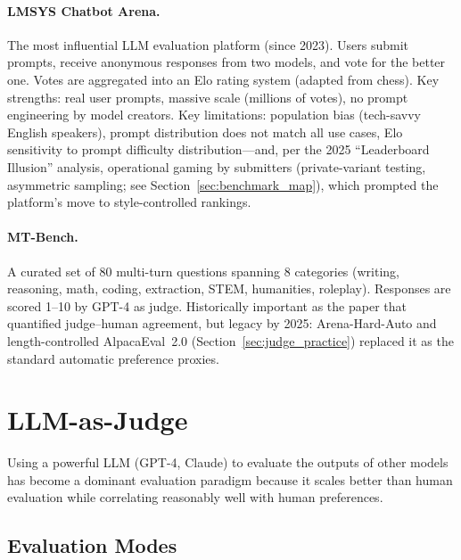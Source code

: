 \paragraph{LMSYS Chatbot Arena.}
The most influential LLM evaluation platform (since 2023).  Users submit
prompts, receive anonymous responses from two models, and vote for the better
one.  Votes are aggregated into an Elo rating system (adapted from chess).  Key
strengths: real user prompts, massive scale (millions of votes), no prompt
engineering by model creators.  Key limitations: population bias (tech-savvy
English speakers), prompt distribution does not match all use cases, Elo
sensitivity to prompt difficulty distribution---and, per the 2025
``Leaderboard Illusion'' analysis, operational gaming by submitters
(private-variant testing, asymmetric sampling; see
Section~\ref{sec:benchmark_map}), which prompted the platform's move to
style-controlled rankings.

\paragraph{MT-Bench.}
A curated set of 80 multi-turn questions spanning 8 categories (writing,
reasoning, math, coding, extraction, STEM, humanities, roleplay).  Responses are
scored 1--10 by GPT-4 as judge.  Historically important as the paper that
quantified judge--human agreement, but legacy by 2025: Arena-Hard-Auto and
length-controlled AlpacaEval~2.0 (Section~\ref{sec:judge_practice}) replaced
it as the standard automatic preference proxies.

\section{LLM-as-Judge}
\label{sec:llm_judge}

Using a powerful LLM (GPT-4, Claude) to evaluate the outputs of other models has
become a dominant evaluation paradigm because it scales better than human
evaluation while correlating reasonably well with human preferences.

\subsection{Evaluation Modes}

